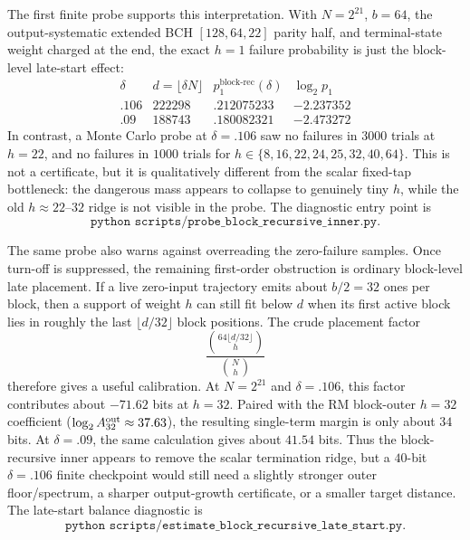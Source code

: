 The first finite probe supports this interpretation.  With \(N=2^{21}\), \(b=64\), the output-systematic extended BCH
\([128,64,22]\) parity half, and terminal-state weight charged at the end, the exact \(h=1\) failure probability is just
the block-level late-start effect:
\[
\begin{array}{c|c|c|c}
\delta & d=\lfloor\delta N\rfloor & p_1^{\mathrm{block\mbox{-}rec}}(\delta) & \log_2 p_1\\
\hline
.106 & 222298 & .212075233 & -2.237352\\
.09 & 188743 & .180082321 & -2.473272
\end{array}
\]
In contrast, a Monte Carlo probe at \(\delta=.106\) saw no failures in \(3000\) trials at \(h=22\), and no failures in
\(1000\) trials for \(h\in\{8,16,22,24,25,32,40,64\}\).  This is not a certificate, but it is qualitatively different
from the scalar fixed-tap bottleneck: the dangerous mass appears to collapse to genuinely tiny \(h\), while the
old \(h\approx22\text{--}32\) ridge is not visible in the probe.  The diagnostic entry point is
\[
\texttt{python scripts/probe\_block\_recursive\_inner.py}.
\]

The same probe also warns against overreading the zero-failure samples.  Once turn-off is suppressed, the remaining
first-order obstruction is ordinary block-level late placement.  If a live zero-input trajectory emits about \(b/2=32\)
ones per block, then a support of weight \(h\) can still fit below \(d\) when its first active block lies in roughly the
last \(\lfloor d/32\rfloor\) block positions.  The crude placement factor
\[
\frac{\binom{64\lfloor d/32\rfloor}{h}}{\binom{N}{h}}
\]
therefore gives a useful calibration.  At \(N=2^{21}\) and \(\delta=.106\), this factor contributes about
\(-71.62\) bits at \(h=32\).  Paired with the RM block-outer \(h=32\) coefficient (\(\log_2 A_{32}^{\rm out}\approx
37.63\)), the resulting single-term margin is only about \(34\) bits.  At \(\delta=.09\), the same calculation gives
about \(41.54\) bits.  Thus the block-recursive inner appears to remove the scalar termination ridge, but a \(40\)-bit
\(\delta=.106\) finite checkpoint would still need a slightly stronger outer floor/spectrum, a sharper output-growth
certificate, or a smaller target distance.  The late-start balance diagnostic is
\[
\texttt{python scripts/estimate\_block\_recursive\_late\_start.py}.
\]

